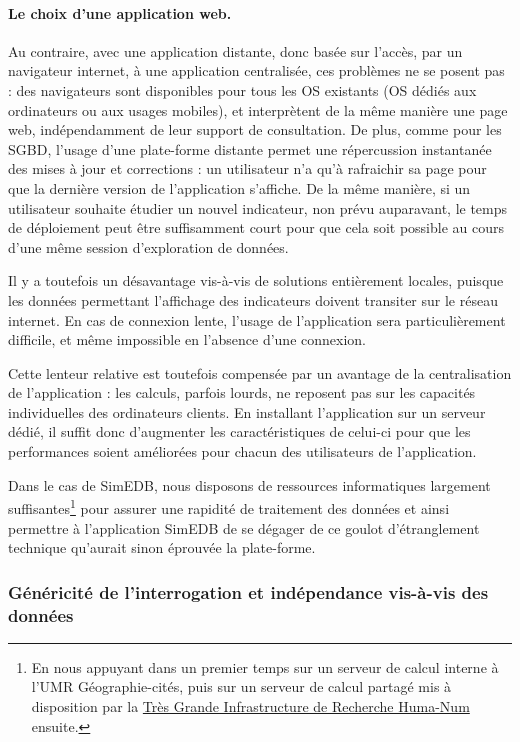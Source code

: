 \paragraph{Le choix d'une application web.}

Au contraire, avec une application distante, donc basée sur l'accès, par un navigateur internet, à une application centralisée, ces problèmes ne se posent pas : des navigateurs sont disponibles pour tous les OS existants (OS dédiés aux ordinateurs ou aux usages mobiles), et interprètent de la même manière une page web, indépendamment de leur support de consultation.
De plus, comme pour les SGBD, l'usage d'une plate-forme distante permet une répercussion instantanée des mises à jour et corrections : un utilisateur n'a qu'à rafraichir sa page pour que la dernière version de l'application s'affiche.
De la même manière, si un utilisateur souhaite étudier un nouvel indicateur, non prévu auparavant, le temps de déploiement peut être suffisamment court pour que cela soit possible au cours d'une même session d'exploration de données.

Il y a toutefois un désavantage vis-à-vis de solutions entièrement locales, puisque les données permettant l'affichage des indicateurs doivent transiter sur le réseau internet.
En cas de connexion lente, l'usage de l'application sera particulièrement difficile, et même impossible en l'absence d'une connexion.

Cette lenteur relative est toutefois compensée par un avantage de la centralisation de l'application : les calculs, parfois lourds, ne reposent pas sur les capacités individuelles des ordinateurs clients.
En installant l'application sur un serveur dédié, il suffit donc d'augmenter les caractéristiques de celui-ci pour que les performances soient améliorées pour chacun des utilisateurs de l'application.

Dans le cas de SimEDB, nous disposons de ressources informatiques largement suffisantes\footnote{
	En nous appuyant dans un premier temps sur un serveur de calcul interne à l'UMR Géographie-cités, puis sur un serveur de calcul partagé mis à disposition par la \href{https://www.huma-num.fr/}{\og Très Grande Infrastructure de Recherche\fg{} Huma-Num} ensuite.
} pour assurer une rapidité de traitement des données et ainsi permettre à l'application SimEDB de se dégager de ce \og goulot d'étranglement\fg{} technique qu'aurait sinon éprouvée la plate-forme.

\subsubsection{Généricité de l'interrogation et indépendance vis-à-vis des données}

